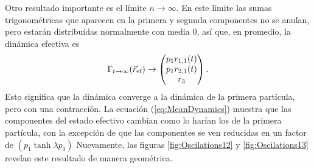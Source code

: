 Otro resultado importante es el límite $n\rightarrow\infty$. En este límite las sumas trigonométricas que aparecen en la primera y segunda componentes no se anulan, pero estarán distribuídas normalmente con media $0$, así que, en promedio, la dinámica efectiva es
\begin{equation}\label{eq:MeanDynamics}
    \Gamma_{t\rightarrow\infty}(\vec{r}_{\text{ef}})\rightarrow\begin{pmatrix}
        p_{1}r_{1,1}(t)\\
        p_{1}r_{2,1}(t)\\
        r_{3}\\
    \end{pmatrix}.
\end{equation}
Esto significa que la dinámica converge a la dinámica de la primera partícula, pero con una contracción. La ecuación (\ref{eq:MeanDynamics}) muestra que las componentes del estado efectivo cambian como lo harían los de la primera partícula, con la excepción de que las componentes se ven reducidas en un factor de $(p_{1}\tanh{\lambda p_{1}})$ Nuevamente, las figuras \ref{fig:Oscilations12} y \ref{fig:Oscilations13} revelan este resultado de manera geométrica.


